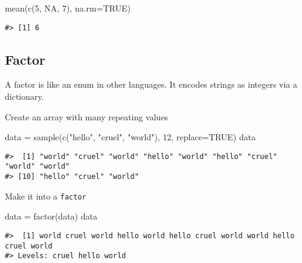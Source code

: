 \documentclass[
]{book}
\newenvironment{Shaded}{\begin{snugshade}}{\end{snugshade}}
\newcommand{\AttributeTok}[1]{\textcolor[rgb]{0.77,0.63,0.00}{#1}}
\newcommand{\ConstantTok}[1]{\textcolor[rgb]{0.00,0.00,0.00}{#1}}
\newcommand{\DecValTok}[1]{\textcolor[rgb]{0.00,0.00,0.81}{#1}}
\newcommand{\FunctionTok}[1]{\textcolor[rgb]{0.00,0.00,0.00}{#1}}
\newcommand{\NormalTok}[1]{#1}
\newcommand{\OtherTok}[1]{\textcolor[rgb]{0.56,0.35,0.01}{#1}}
\newcommand{\StringTok}[1]{\textcolor[rgb]{0.31,0.60,0.02}{#1}}
\begin{document}
\begin{Shaded}
\begin{Highlighting}[]
\FunctionTok{mean}\NormalTok{(}\FunctionTok{c}\NormalTok{(}\DecValTok{5}\NormalTok{, }\ConstantTok{NA}\NormalTok{, }\DecValTok{7}\NormalTok{), }\AttributeTok{na.rm=}\ConstantTok{TRUE}\NormalTok{)}
\end{Highlighting}
\end{Shaded}

\begin{verbatim}
#> [1] 6
\end{verbatim}

\hypertarget{factor}{%
\subsection{Factor}\label{factor}}

A factor is like an enum in other languages. It encodes strings as integers via a dictionary.

Create an array with many repeating values

\begin{Shaded}
\begin{Highlighting}[]
\NormalTok{data }\OtherTok{=} \FunctionTok{sample}\NormalTok{(}\FunctionTok{c}\NormalTok{(}\StringTok{"hello"}\NormalTok{, }\StringTok{"cruel"}\NormalTok{, }\StringTok{"world"}\NormalTok{), }\DecValTok{12}\NormalTok{, }\AttributeTok{replace=}\ConstantTok{TRUE}\NormalTok{)}
\NormalTok{data}
\end{Highlighting}
\end{Shaded}

\begin{verbatim}
#>  [1] "world" "cruel" "world" "hello" "world" "hello" "cruel" "world" "world"
#> [10] "hello" "cruel" "world"
\end{verbatim}

Make it into a \texttt{factor}

\begin{Shaded}
\begin{Highlighting}[]
\NormalTok{data }\OtherTok{=} \FunctionTok{factor}\NormalTok{(data)}
\NormalTok{data}
\end{Highlighting}
\end{Shaded}

\begin{verbatim}
#>  [1] world cruel world hello world hello cruel world world hello cruel world
#> Levels: cruel hello world
\end{verbatim}
\end{document}
